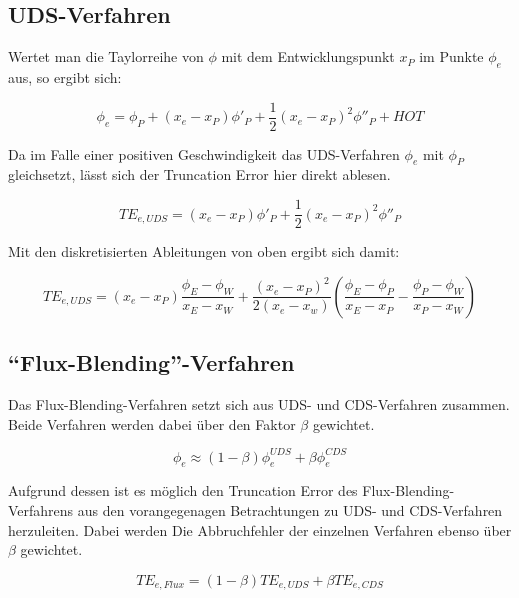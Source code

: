 \documentclass[10pt, ngerman,colorback,accentcolor=tud2d]{tudreport}
\begin{document}
\subsection{UDS-Verfahren}

Wertet man die Taylorreihe von $\phi$ mit dem Entwicklungspunkt $x_P$ im Punkte $\phi_e$
aus, so ergibt sich:

\begin{equation*}
  \phi_e = \phi_P +(x_e-x_P) \phi'_P + \frac{1}{2} (x_e-x_P)^2 \phi''_P+HOT
\end{equation*}

Da im Falle einer positiven Geschwindigkeit das UDS-Verfahren $\phi_e$ mit $\phi_P$
gleichsetzt, lässt sich der Truncation Error hier direkt ablesen.

\begin{equation*}
  TE_{e, UDS} = (x_e-x_P) \phi'_P + \frac{1}{2} (x_e-x_P)^2 \phi''_P
\end{equation*}

Mit den diskretisierten Ableitungen von oben ergibt sich damit:

\begin{equation}
  TE_{e, UDS} = (x_e-x_P) \frac{\phi_E-\phi_W}{x_E-x_W}+
  \frac{(x_e-x_P)^2}{2(x_e-x_w)} \left({\frac{\phi_E-\phi_P}{x_E-x_P}
  - \frac{\phi_P-\phi_W}{x_P-x_W} }\right)
\end{equation}



\subsection{``Flux-Blending''-Verfahren}

Das Flux-Blending-Verfahren setzt sich aus UDS- und CDS-Verfahren zusammen. Beide
Verfahren werden dabei über den Faktor $\beta$ gewichtet.

\begin{equation*}
\phi_e \approx (1-\beta)\phi_e^{UDS} + \beta \phi_e^{CDS} 
\end{equation*}

Aufgrund dessen ist es möglich den Truncation Error des Flux-Blending-Verfahrens aus
den vorangegenagen Betrachtungen zu UDS- und CDS-Verfahren herzuleiten.
Dabei werden Die Abbruchfehler der einzelnen Verfahren ebenso über $\beta$ gewichtet.

\begin{equation}
  TE_{e, Flux} = (1-\beta) TE_{e, UDS} + \beta TE_{e, CDS}
\end{equation}
\end{document}

